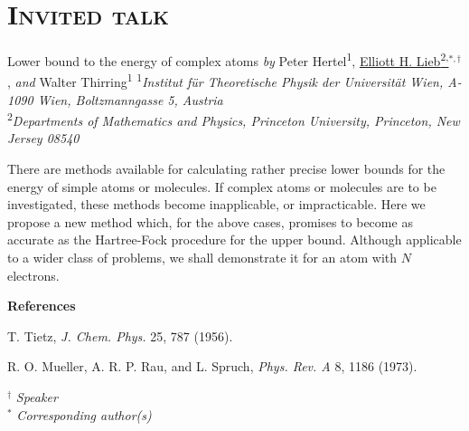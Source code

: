 \documentclass[12pt]{book}
\newenvironment{conf-abstract}[4][]{
  \needspace{10\baselineskip}
  \begin{center}
    { \renewcommand\textsuperscript[1]{}
      \phantomsection\addcontentsline{toc}{section}
      {\texorpdfstring{#2 (\emph{#3})}{#2 (#3)}}
    }
    {{\large\bfseries #2}\marginnote{#1}\par}
    \bigskip\smallskip
    {#3\par}
    \smallskip
    {\small #4\par}
  \end{center}
}{%
  \bigskip
  \hrule
  \bigskip
}
\newcommand{\indexauthors}[1]{%
  \forcsvlist{\index}{#1}
}
\begin{document}
\section{\textsc{Invited talk}}

\noindent \hrulefill

\begin{conf-abstract}[IT-XX] %
{Lower bound to the energy of complex atoms}  
{\textit{by} Peter Hertel\textsuperscript{1}, \href{mailto:lieb@math.princeton.edu}{Elliott H. Lieb\textsuperscript{2,}$^{*,\dag}$}, \textit{and} Walter Thirring\textsuperscript{1}} %
{\textsuperscript{1}\textit{Institut für Theoretische Physik der Universität Wien, A-1090 Wien, Boltzmanngasse 5, Austria}\\ 
{\textsuperscript{2}\textit{Departments of Mathematics and Physics, Princeton University, Princeton, New Jersey 08540}}\\
}
\indexauthors{lieb}

There are methods available for calculating rather precise lower bounds for the energy of simple atoms or molecules. If complex atoms or molecules are to be investigated, these methods become inapplicable, or impracticable. Here we propose a new method which, for the above cases, promises to become as accurate as the Hartree-Fock procedure for the upper bound. Although applicable to a wider class of problems, we shall demonstrate it for an atom with $N$ electrons.


{\small{
{$\;$\\\bf References}%
\begin{enumerate}[label={[\arabic*]}]
\item T. Tietz, \textit{J. Chem. Phys.} 25, 787 (1956).
\vspace*{-0.3cm}\item R. O. Mueller, A. R. P. Rau, and L. Spruch, \textit{Phys. Rev. A} 8, 1186 (1973).
\end{enumerate}
}}

\noindent $^\dag$ \textit{Speaker}\\
$^*$ \textit{Corresponding author(s)}

\end{conf-abstract}
 
\end{document}
